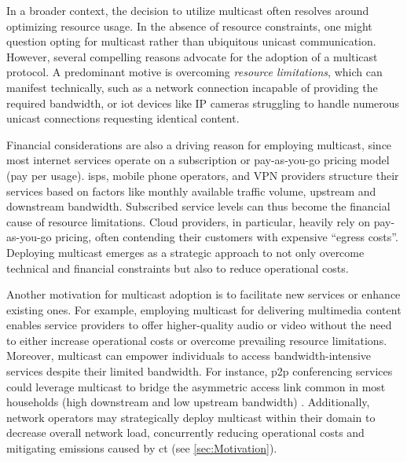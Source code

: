 In a broader context, the decision to utilize multicast often resolves around
    optimizing resource usage.
In the absence of resource constraints, one might question opting for multicast
    rather than ubiquitous unicast communication.
However, several compelling reasons advocate for the adoption of a multicast
    protocol.
A predominant motive is overcoming \textit{resource limitations}, which can
    manifest technically, such as a network connection incapable of providing
    the required bandwidth, or \gls{iot} devices like IP cameras struggling
    to handle numerous unicast connections requesting identical content.

Financial considerations are also a driving reason for employing multicast,
since most internet services operate on a subscription or pay-as-you-go pricing
    model (pay per usage).
\glspl{isp}, mobile phone operators, and VPN providers structure their services
    based on factors like monthly available traffic volume, upstream and
    downstream bandwidth.
Subscribed service levels can thus become the financial cause of resource
    limitations.
Cloud providers, in particular, heavily rely on pay-as-you-go pricing, often
    contending their customers with expensive ``egress costs''.
Deploying multicast emerges as a strategic approach to not only overcome
    technical and financial constraints but also to reduce operational costs.

Another motivation for multicast adoption is to facilitate new services or 
    enhance existing ones.
For example, employing multicast for delivering multimedia content enables
    service providers to offer higher-quality audio or video without the need
    to either increase operational costs or overcome prevailing resource
    limitations.
Moreover, multicast can empower individuals to access bandwidth-intensive
    services despite their limited bandwidth.
For instance, \gls{p2p} conferencing services could leverage multicast to
    bridge the asymmetric access link common in most households (high
    downstream and low upstream bandwidth) \cite{xcast_rfc,cartesian_us_bw}.
Additionally, network operators may strategically deploy multicast within their
    domain to decrease overall network load, concurrently reducing operational
    costs and mitigating emissions caused by \gls{ct} (see
    \autoref{sec:Motivation}).

